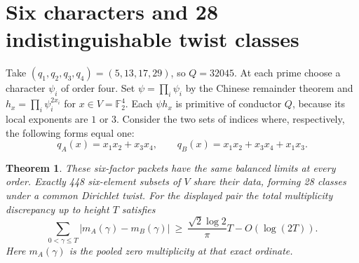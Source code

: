 \documentclass[11pt,letterpaper]{article}
\newtheorem{theorem}{Theorem}
\newcommand{\F}{\mathbb F}
\begin{document}
\section{Six characters and 28 indistinguishable twist classes}\label{sec:six}
Take $(q_1,q_2,q_3,q_4)=(5,13,17,29)$, so $Q=32045$. At each prime choose a character $\psi_i$ of order four. Set $\psi=\prod_i\psi_i$ by the Chinese remainder theorem and $h_x=\prod_i\psi_i^{2x_i}$ for $x\in V=\F_2^4$. Each $\psi h_x$ is primitive of conductor $Q$, because its local exponents are $1$ or $3$. Consider the two sets of indices where, respectively, the following forms equal one:
\[
 q_A(x)=x_1x_2+x_3x_4,\qquad q_B(x)=x_1x_2+x_3x_4+x_1x_3 .
\]
\begin{theorem}\label{th:six}
These six-factor packets have the same balanced limits at every order. Exactly 448 six-element subsets of $V$ share their data, forming 28 classes under a common Dirichlet twist. For the displayed pair the total multiplicity discrepancy up to height $T$ satisfies
\begin{equation}
 \sum_{0<\gamma\le T}|m_A(\gamma)-m_B(\gamma)|
 \ \ge\ \frac{\sqrt2\log 2}{\pi}T-O(\log(2T)). \label{eq:gap}
\end{equation}
Here $m_A(\gamma)$ is the pooled zero multiplicity at that exact ordinate.
\end{theorem}
\end{document}
